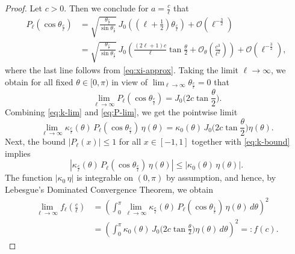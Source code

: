 \documentclass[a4paper,11pt,DIV=11,%
abstract=on%
]{scrartcl}
\begin{document}
\begin{proof}
	Let $c>0$. Then we conclude for $a=\frac c\ell$ that
	\begin{align*}
		P_\ell(\cos\theta_{\frac c\ell})
		&=\sqrt{\frac{\theta_{\frac c\ell}}{\sin\theta_{\frac c\ell}}}\,
		J_0\left(\left(\ell+\frac12\right)\theta_{\frac c\ell}\right)
		+ \mathcal{O}\left(\ell^{-\frac32}\right)\\
		&= \sqrt{\frac{\theta_{\frac c\ell}}{\sin\theta_{\frac c\ell}}}\,
		J_0\left(\frac{(2\ell+1)c}{\ell} \tan\frac{\theta}{2}
		+ \mathcal{O}_\theta\left(\frac {c^3}{\ell^2} \right)\right)
		+ \mathcal{O}\left(\ell^{-\frac32}\right),
	\end{align*}
	where the last line follows from \eqref{eq:xi-approx}. Taking the limit $\ell\to\infty$, we
	obtain for all fixed $\theta\in[0,\pi)$ in view of
	$\lim_{\ell\to\infty} \theta_{\frac c\ell}=0$ that
	\begin{equation}
		\lim_{\ell\to\infty} P_\ell(\cos \theta_{\frac c\ell})
		= J_0\biggl(2c \tan\frac{\theta}{2}\biggr).
		\label{eq:P-lim}
	\end{equation}
	Combining \eqref{eq:k-lim} and \eqref{eq:P-lim}, we get the pointwise limit
	\begin{equation*}
		\lim_{\ell\to\infty}
		\kappa_{\frac c\ell}(\theta)\, P_\ell(\cos\theta_{\frac c\ell})\, \eta(\theta)
		= \kappa_0(\theta)\, J_0\biggl(2c \tan\frac\theta2\biggr) \eta(\theta).
	\end{equation*}
	Next, the bound $|P_\ell(x)|\leq 1$ for all $x\in[-1,1]$ together with \eqref{eq:k-bound}
	implies
	\begin{equation}
		|\kappa_{\frac c\ell}(\theta)\, P_\ell(\cos\theta_{\frac c\ell})\, \eta(\theta)|
		\le |\kappa_{0}(\theta)\, \eta(\theta)|.
		\label{eq:f-ell-bound}
	\end{equation}
	The function $|\kappa_0\, \eta|$ is integrable on $(0,\pi)$ by assumption, and hence, by
	Lebesgue's Dominated Convergence Theorem, we obtain
	\begin{align*}
		\lim_{\ell\to\infty} f_\ell\left(\frac{c}{\ell}\right)
		&= \left( \int_0^\pi \lim_{\ell\to\infty} \kappa_{\frac c\ell}(\theta)\,
		P_\ell(\cos\theta_{\frac1\ell})\, \eta(\theta)\, d\theta \right)^2\\
		&= \left( \int_0^\pi \kappa_0(\theta)\, J_0\biggl(2c\tan\frac\theta2\biggr) \eta(\theta)\,
		d\theta\right)^2 =:f(c).
	\end{align*}
	

\end{proof}
\end{document}
